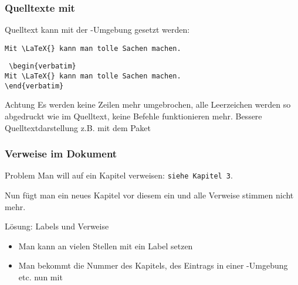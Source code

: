 \begin{frame}[fragile]
    \frametitle{Quelltexte mit }
    
    Quelltext kann mit der -Umgebung gesetzt werden:
    
    \medskip
    \begin{verbatim}
Mit \LaTeX{} kann man tolle Sachen machen.
    \end{verbatim}
    
    \pause
    \begin{codeblock}
\texttt{%
\textbackslash{}begin\{verbatim\}\\
Mit \textbackslash{}LaTeX\{\} kann man tolle Sachen machen.\\
\textbackslash{}end\{verbatim\}
}
    \end{codeblock}
    \pause
    \begin{alertblock}{Achtung}
        Es werden keine Zeilen mehr umgebrochen, alle Leerzeichen werden so abgedruckt wie im Quelltext, keine Befehle funktionieren mehr. Bessere Quelltextdarstellung z.B. mit dem Paket 
    \end{alertblock}
\end{frame}


\begin{frame}[fragile]
    \frametitle{Verweise im Dokument}
    \begin{alertblock}{Problem}
        Man will auf ein Kapitel verweisen: \verb+siehe Kapitel 3+.\pause
        
        Nun fügt man ein neues Kapitel vor diesem ein und alle Verweise stimmen nicht mehr.
    \end{alertblock}
    
    \pause
    \begin{block}{Lösung: Labels und Verweise}
        \begin{itemize}
            \item Man kann an vielen Stellen mit  ein Label setzen\pause
            \item Man bekommt die Nummer des Kapitels, des Eintrags in einer -Umgebung etc. nun mit 
        \end{itemize}
    \end{block}
\end{frame}

